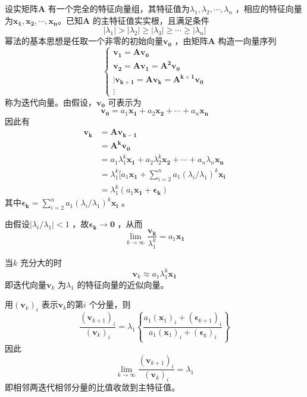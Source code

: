 \documentclass[a4paper]{article}
\begin{document}
设实矩阵$\mathbf{A}$ 有一个完全的特征向量组，其特征值为$\lambda_1, \lambda_2, \cdots, \lambda_n$ ，相应的特征向量为$\mathbf{x_1}, \mathbf{x_2}, \cdots, \mathbf{x_{n}}$。已知$\mathbf{A}$ 的主特征值实实根，且满足条件
\[
| \lambda_1 | > | \lambda_2 | \ge | \lambda_3 | \ge \cdots \ge | \lambda_n | \tag{8.2.1} \label{eq:8.2.1} 	
\] 
幂法的基本思想是任取一个非零的初始向量$\mathbf{v_0}$ ，由矩阵$\mathbf{A}$ 构造一向量序列
\[
\tag{8.2.2} \label{eq:8.2.2} 
\begin{cases}
	\mathbf{v_1} = \mathbf{A v_0} \\
	\mathbf{v_2} = \mathbf{A v_1} = \mathbf{A^2 v_0} \\
	\vdots
	\mathbf{v_{k+1}} = \mathbf{A v_k} = \mathbf{A^{k+1} v_0} \\
	\vdots
\end{cases} 
\] 
称为迭代向量。由假设，$\mathbf{v_0}$ 可表示为
\[
\mathbf{v_0} = a_1 \mathbf{x_1} + a_2 \mathbf{x_2} + \cdots + a_n \mathbf{x_{n}} \tag{8.2.3} \label{eq:8.2.3} 
\] 
因此有
\[
	\begin{align*}
		\mathbf{v_k} &= \mathbf{A v_{k-1}} \\
			     &= \mathbf{A^{k} v_0} \\
			     &= a_1 \lambda_1^{k} \mathbf{x_1} + a_2 \lambda_2^{k} \mathbf{x_2} + \cdots + a_n \lambda_n \mathbf{x_{n}} \\ 
			     &= \lambda_1^{k} [a_1 \mathbf{x_1} + \sum_{i=2}^{n} a_1 (\lambda_i / \lambda_1)^{k} \mathbf{x_{i}} \\ 
			     &= \lambda_1^{k} (a_1 \mathbf{x_1} + \mathbf{\epsilon_k})
	\end{align*}
\] 
其中$\mathbf{\epsilon_k} = \sum_{i=2}^{n} a_1 (\lambda_i / \lambda_1)^{k} \mathbf{x_{i}}$ 。

由假设$| \lambda_i / \lambda_1 | < 1$ ，故$\mathbf{\epsilon_k} \to \mathbf{0}$ ，从而
\[
\lim_{k \to \infty} \frac{\mathbf{v_k}}{\lambda_1^{k}} = a_1 \mathbf{x_1} \tag{8.2.4} \label{eq:8.2.4} 
\] 

当$k$ 充分大的时
\[
\mathbf{v}_k \approx a_1 \lambda_1^{k} \mathbf{x_1} \tag{8.2.5} \label{eq:8.2.5} 
\] 
即迭代向量$\mathbf{v}_k$ 为$\lambda_1$ 的特征向量的近似向量。

用$(\mathbf{v}_k)_i$ 表示$\mathbf{v}_k$的第$i$ 个分量，则
\[
	\frac{(\mathbf{v}_{k+1})_i}{(\mathbf{v}_k)_i} = \lambda_1 \left\{ \frac{a_1(\mathbf{x}_1)_i + (\mathbf{\epsilon}_{k+1})_i}{a_1(\mathbf{x}_1)_i + (\mathbf{\epsilon}_k)_i} \right\} \tag{8.2.6} \label{eq:8.2.6} 
\] 
因此
\[
	\lim_{k \to \infty} \frac{(\mathbf{v}_{k+1})_i}{(\mathbf{v}_k)_i} = \lambda_1 \tag{8.2.7} \label{eq:8.2.7} 
\] 
即相邻两迭代相邻分量的比值收敛到主特征值。
\end{document}
